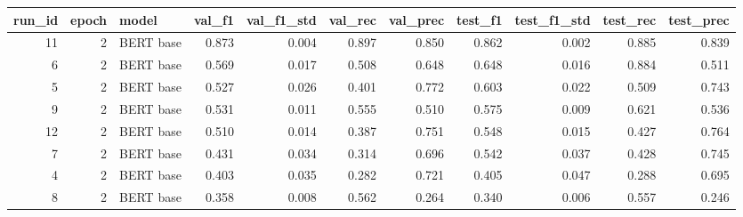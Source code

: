 \begin{tabular}{rrlrrrrrrrr}
\toprule
 run\_id &  epoch &     model &  val\_f1 &  val\_f1\_std &  val\_rec &  val\_prec &  test\_f1 &  test\_f1\_std &  test\_rec &  test\_prec \\
\midrule
     11 &      2 & BERT base &   0.873 &       0.004 &    0.897 &     0.850 &    0.862 &        0.002 &     0.885 &      0.839 \\
      6 &      2 & BERT base &   0.569 &       0.017 &    0.508 &     0.648 &    0.648 &        0.016 &     0.884 &      0.511 \\
      5 &      2 & BERT base &   0.527 &       0.026 &    0.401 &     0.772 &    0.603 &        0.022 &     0.509 &      0.743 \\
      9 &      2 & BERT base &   0.531 &       0.011 &    0.555 &     0.510 &    0.575 &        0.009 &     0.621 &      0.536 \\
     12 &      2 & BERT base &   0.510 &       0.014 &    0.387 &     0.751 &    0.548 &        0.015 &     0.427 &      0.764 \\
      7 &      2 & BERT base &   0.431 &       0.034 &    0.314 &     0.696 &    0.542 &        0.037 &     0.428 &      0.745 \\
      4 &      2 & BERT base &   0.403 &       0.035 &    0.282 &     0.721 &    0.405 &        0.047 &     0.288 &      0.695 \\
      8 &      2 & BERT base &   0.358 &       0.008 &    0.562 &     0.264 &    0.340 &        0.006 &     0.557 &      0.246 \\
\bottomrule
\end{tabular}
